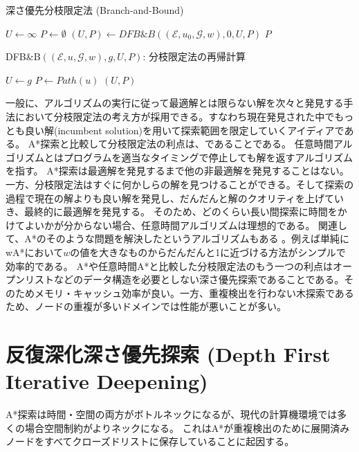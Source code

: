 \begin{algorithm}
\caption{深さ優先分枝限定法 (Branch-and-Bound)}
\label{alg:branch-and-bound}
	$U \leftarrow \infty$\;
	$P \leftarrow \emptyset$\;
	$(U, P) \leftarrow DFB\&B((\mathcal{E}, u_0, \mathcal{G}, w), 0, U, P)$\;
	\Return $P$\;
\end{algorithm}

\begin{algorithm}
\caption{DFB\&B$((\mathcal{E}, u, \mathcal{G}, w), g, U, P)$: 分枝限定法の再帰計算}
\label{alg:branch-and-bound-rec}
	 {
		 {
			$U \leftarrow g$\;
			$P \leftarrow Path(u)$\;
		}
	}
  \Return $(U, P)$
\end{algorithm}

一般に、アルゴリズムの実行に従って最適解とは限らない解を次々と発見する手法において分枝限定法の考え方が採用できる。すなわち現在発見された中でもっとも良い解(incumbent solution)を用いて探索範囲を限定していくアイディアである。
A*探索と比較して分枝限定法の利点は、であることである。
任意時間アルゴリズムとはプログラムを適当なタイミングで停止しても解を返すアルゴリズムを指す。
A*探索は最適解を発見するまで他の非最適解を発見することはない。一方、分枝限定法はすぐに何かしらの解を見つけることができる。そして探索の過程で現在の解よりも良い解を発見し、だんだんと解のクオリティを上げていき、最終的に最適解を発見する。
そのため、どのくらい長い間探索に時間をかけてよいかが分からない場合、任意時間アルゴリズムは理想的である。
関連して、A*のそのような問題を解決したというアルゴリズムもある \cite{likhachev2004ara,hansen2007anytime,richter2010joy}。例えば単純にwA*において$w$の値を大きなものからだんだんと1に近づける方法がシンプルで効率的である。
A*や任意時間A*と比較した分枝限定法のもう一つの利点はオープンリストなどのデータ構造を必要としない深さ優先探索であることである。そのためメモリ・キャッシュ効率が良い。一方、重複検出を行わない木探索であるため、ノードの重複が多いドメインでは性能が悪いことが多い。


\section{反復深化深さ優先探索 (Depth First Iterative Deepening)}
\label{sec:depth-first-iterative-deepening}
A*探索は時間・空間の両方がボトルネックになるが、現代の計算機環境では多くの場合空間制約がよりネックになる。
これはA*が重複検出のために展開済みノードをすべてクローズドリストに保存していることに起因する。

